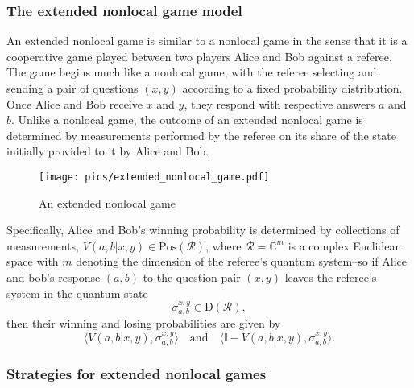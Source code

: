 \documentclass[nofootinbib,superscriptaddress,a4paper,twocolumn,longbibliography,floatfix,pra]{revtex4-2}
\renewcommand{\ip}[2]{\langle #1 , #2\rangle}
\newcommand{\I}{\mathbb{I}}
\newcommand{\setft}[1]{\mathrm{#1}}
\newcommand{\Density}{\setft{D}}
\newcommand{\Pos}{\setft{Pos}}
\newcommand{\complex}{\mathbb{C}}
\newcommand{\R}{\mathcal{R}}
\begin{document}
\subsubsection{The extended nonlocal game model}
\label{sec:extended_nonlocal_game_model}

An extended nonlocal game is similar to a nonlocal game in the sense that it is
a cooperative game played between two players Alice and Bob against a referee.
The game begins much like a nonlocal game, with the referee selecting and
sending a pair of questions $(x,y)$ according to a fixed probability
distribution. Once Alice and Bob receive $x$ and $y$, they respond with
respective answers $a$ and $b$. Unlike a nonlocal game, the outcome of an
extended nonlocal game is determined by measurements performed by the referee
on its share of the state initially provided to it by Alice and Bob.

\begin{figure}[!htpb]
    \centering
    \texttt{[image: pics/extended\_nonlocal\_game.pdf]}
    \caption{An extended nonlocal game}
    \label{fig:extended_nonlocal_game}
\end{figure}

Specifically, Alice and Bob's winning probability is determined by collections
of measurements, $V(a,b|x,y) \in \Pos(\R)$, where $\R = \complex^m$ is a
complex Euclidean space with $m$ denoting the dimension of the referee's
quantum system--so if Alice and bob's response $(a,b)$ to the question pair
$(x,y)$ leaves the referee's system in the quantum state
\begin{equation}
    \sigma_{a,b}^{x,y} \in \Density(\R),
\end{equation}
then their winning and losing probabilities are given by
\begin{equation}
    \ip{V(a,b|x,y)}{\sigma_{a,b}^{x,y}} \quad \text{and} \quad \ip{\I -
    V(a,b|x,y)}{\sigma_{a,b}^{x,y}}.
\end{equation}

\subsubsection{Strategies for extended nonlocal games}
\label{sec:strategies_for_extended_nonlocal_games}
\end{document}
